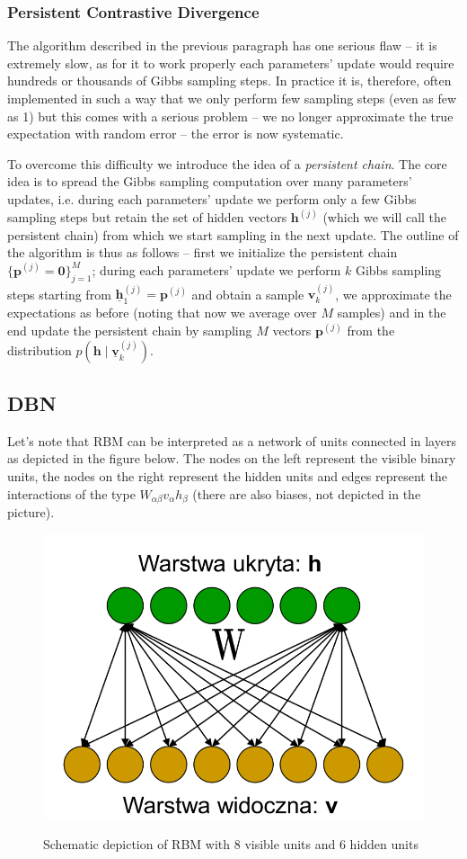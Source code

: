 \documentclass{myclass}
\begin{document}
\subsubsection{Persistent Contrastive Divergence}

The algorithm described in the previous paragraph has one serious flaw -- it is extremely slow, as
for it to work properly each parameters' update would require hundreds or thousands of Gibbs
sampling steps. In practice it is, therefore, often implemented in such a way that we only perform
few sampling steps (even as few as 1) but this comes with a serious problem -- we no longer
approximate the true expectation with random error -- the error is now systematic.

To overcome this difficulty we introduce the idea of a \emph{persistent chain}. The core idea is to
spread the Gibbs sampling computation over many parameters' updates, i.e. during each parameters'
update we perform only a few Gibbs sampling steps but retain the set of hidden vectors
\(\bm{h}^{(j)}\) (which we will call the persistent chain) from which we start sampling in the next
update. The outline of the algorithm is thus as follows -- first we initialize the persistent chain
\(\{\bm{p}^{(j)} = \bm{0}\}_{j=1}^M\); during each parameters' update we perform \(k\) Gibbs
sampling steps starting from \(\underline{\bm{h}}_1^{(j)} = \bm{p}^{(j)}\) and obtain a sample
\(\bm{v}_k^{(j)}\), we approximate the expectations as before (noting that now we average over \(M\)
samples) and in the end update the persistent chain by sampling \(M\) vectors \(\bm{p}^{(j)}\) from
the distribution \(p(\bm{h} \mid \underline{\bm{v}}_k^{(j)})\).


\subsection{DBN}

Let's note that RBM can be interpreted as a network of units connected in layers as depicted in the
figure below. The nodes on the left represent the visible binary units, the nodes on the right
represent the hidden units and edges represent the interactions of the type \(W_{\alpha\beta}
v_\alpha h _\beta\) (there are also biases, not depicted in the picture).

\begin{figure}[ht]
   \centering
   \includegraphics[width=0.65\columnwidth]{figs/rbm.png}
   \label{fig:rbm}
   \caption{Schematic depiction of RBM with 8 visible units and 6 hidden units}
\end{figure}
\end{document}
